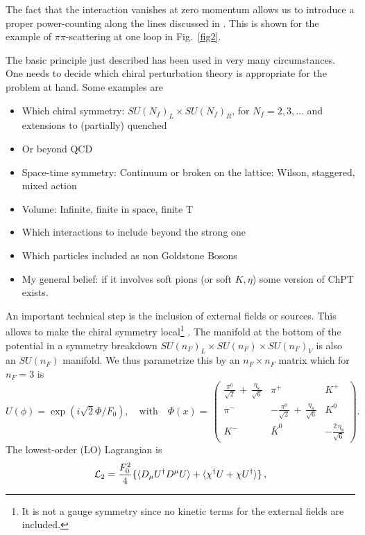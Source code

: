 \documentclass[cits,hyper]{PoS}
\begin{document}
The fact that the interaction vanishes at zero momentum allows us to
introduce a proper power-counting along the lines discussed in \cite{Weinberg0}.
This is shown for the example of $\pi\pi$-scattering at one loop in Fig.~\ref{fig2}.

The basic principle just described has been used in very many circumstances.
One needs to decide which chiral perturbation theory
is appropriate for the problem at hand. Some examples are
\begin{itemize}
\setlength{\topsep}{0cm}
\setlength{\itemsep}{0cm}
\setlength{\parsep}{0cm}
\item Which chiral symmetry:
  $SU(N_f)_L\times SU(N_f)_R$, for $N_f=2,3,\ldots$ and
  extensions to (partially) quenched
\item Or beyond QCD
\item Space-time symmetry:
  Continuum or broken on the lattice:
    Wilson, staggered, mixed action
\item Volume: Infinite, finite in space, finite T
\item Which interactions to include beyond the strong one
\item Which particles included as non Goldstone Bosons
\item My general belief: if it involves soft pions (or soft $K,\eta$) some
version of ChPT exists.
\end{itemize}
An important technical step is the inclusion of external fields or sources.
This allows to make the chiral symmetry local\footnote{It is not a gauge symmetry since no kinetic terms for the external fields are included.} \cite{GL1,GL2}.
The manifold at the bottom of the potential in a symmetry breakdown
$SU(n_F)_L\times SU(n_F)\times SU(n_F)_V$ is also an $SU(n_F)$ manifold.
We thus parametrize this by an $n_F\times n_F$ matrix which for $n_F=3$
is
\begin{equation}
U(\phi) = \exp(i \sqrt{2} \Phi/F_0),\quad\mathrm{with}\quad
\Phi (x) = \, \left( \begin{array}{ccc}
\displaystyle\frac{ \pi^0}{ \sqrt 2} \, + \, \frac{ \eta_8}{ \sqrt 6}
 & \pi^+ & K^+ \\
\pi^- &\displaystyle - \frac{\pi^0}{\sqrt 2} \, + \, \frac{ \eta_8}
{\sqrt 6}    & K^0 \\
K^- & \bar K^0 &\displaystyle - \frac{ 2 \, \eta_8}{\sqrt 6}
\end{array}  \right) .
\end{equation}
The lowest-order (LO) Lagrangian is
\begin{equation}
{\cal L}_2 = \frac{F_0^2}{4} \{\langle D_\mu U^\dagger D^\mu U \rangle 
+\langle \chi^\dagger U+\chi U^\dagger \rangle \}\, ,
\end{equation}
\end{document}
